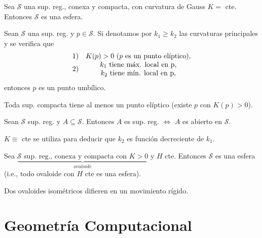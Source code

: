 \documentclass[twoside]{report}
\begin{document}
\begin{teorema}
Sea $\mathcal{S}$ una sup. reg., conexa y compacta, con curvatura de Gauss $K=$ cte. Entonces $\mathcal{S}$ es una esfera.
\end{teorema}

\begin{lemma}
Sean $\mathcal{S}$ una sup. reg. y $p \in \mathcal{S}$. Si denotamos por $k_1\geq k_2$ las curvaturas principales y se verifica que
$$
\begin{array}{l c }
1) & K(p)>0 \, \,(p\text{ es un punto el\'iptico}), \\
2) & {\begin{array}{c}
k_1 \,\,\text{tiene m\'ax. local en p},\\
k_2 \,\,\text{tiene m\'in. local en p},
\end{array}}
\end{array}$$
entonces $p$ es un punto umb\'ilico.
\end{lemma}

\begin{lemma}
Toda sup. compacta tiene al menos un punto el\'iptico (existe $p$ con $K(p)>0$).
\end{lemma}

\begin{lemma}
Sean $\mathcal{S}$ sup. reg. y $ A \subseteq \mathcal{S}$. Entonces $A$ es  sup. reg. $\Leftrightarrow$ $A$ es abierto en $\mathcal{S}$.
\end{lemma}

\begin{nota}
$K \equiv$ cte se utiliza para deducir que $k_2$ es funci\'on decreciente de $k_1$.
\end{nota}

\begin{teorema}
Sea $\underbrace{\mathcal{S} \text{ sup. reg., conexa y compacta con } K>0}_{ovaloide}$ y $H$ cte. Entonces $\mathcal{S}$ es una esfera (i.e., todo ovaloide con $H$ cte es una esfera).
\end{teorema}

\begin{teorema}
Dos ovaloides isom\'etricos difieren en un movimiento r\'igido.
\end{teorema}



\chapter{Geometría Computacional}
\end{document}
